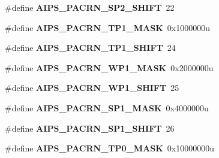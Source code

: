 \begin{DoxyCompactItemize}
\item 
\#define {\bfseries A\+I\+P\+S\+\_\+\+P\+A\+C\+R\+N\+\_\+\+S\+P2\+\_\+\+S\+H\+I\+FT}~22\hypertarget{group__AIPS__Register__Masks_ga40c250cc4e6aea6ff7114e697930dbcb}{}\label{group__AIPS__Register__Masks_ga40c250cc4e6aea6ff7114e697930dbcb}

\item 
\#define {\bfseries A\+I\+P\+S\+\_\+\+P\+A\+C\+R\+N\+\_\+\+T\+P1\+\_\+\+M\+A\+SK}~0x1000000u\hypertarget{group__AIPS__Register__Masks_ga635455c5582700c509c92e57da0d2951}{}\label{group__AIPS__Register__Masks_ga635455c5582700c509c92e57da0d2951}

\item 
\#define {\bfseries A\+I\+P\+S\+\_\+\+P\+A\+C\+R\+N\+\_\+\+T\+P1\+\_\+\+S\+H\+I\+FT}~24\hypertarget{group__AIPS__Register__Masks_ga180bcf6b74808060fb32888e0c55df14}{}\label{group__AIPS__Register__Masks_ga180bcf6b74808060fb32888e0c55df14}

\item 
\#define {\bfseries A\+I\+P\+S\+\_\+\+P\+A\+C\+R\+N\+\_\+\+W\+P1\+\_\+\+M\+A\+SK}~0x2000000u\hypertarget{group__AIPS__Register__Masks_gacb6bc84650cdad0c9becba836de9cf45}{}\label{group__AIPS__Register__Masks_gacb6bc84650cdad0c9becba836de9cf45}

\item 
\#define {\bfseries A\+I\+P\+S\+\_\+\+P\+A\+C\+R\+N\+\_\+\+W\+P1\+\_\+\+S\+H\+I\+FT}~25\hypertarget{group__AIPS__Register__Masks_gac732c81bbc1619d8d0da6895ab7866f4}{}\label{group__AIPS__Register__Masks_gac732c81bbc1619d8d0da6895ab7866f4}

\item 
\#define {\bfseries A\+I\+P\+S\+\_\+\+P\+A\+C\+R\+N\+\_\+\+S\+P1\+\_\+\+M\+A\+SK}~0x4000000u\hypertarget{group__AIPS__Register__Masks_gae9c06e20322a0251ebd7bbf695918655}{}\label{group__AIPS__Register__Masks_gae9c06e20322a0251ebd7bbf695918655}

\item 
\#define {\bfseries A\+I\+P\+S\+\_\+\+P\+A\+C\+R\+N\+\_\+\+S\+P1\+\_\+\+S\+H\+I\+FT}~26\hypertarget{group__AIPS__Register__Masks_ga85a1c85ee827d9dda3387b3c49c494a8}{}\label{group__AIPS__Register__Masks_ga85a1c85ee827d9dda3387b3c49c494a8}

\item 
\#define {\bfseries A\+I\+P\+S\+\_\+\+P\+A\+C\+R\+N\+\_\+\+T\+P0\+\_\+\+M\+A\+SK}~0x10000000u\hypertarget{group__AIPS__Register__Masks_gafa65d16a8ef57d9863108502ee7ec35e}{}\label{group__AIPS__Register__Masks_gafa65d16a8ef57d9863108502ee7ec35e}


\end{DoxyCompactItemize}
